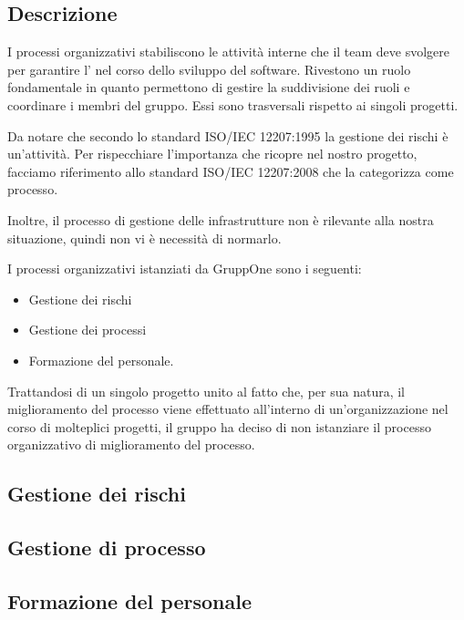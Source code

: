 \documentclass[../norme-di-progetto.tex]{subfiles}
\begin{document}
\subsection{Descrizione}%
\label{sub:processi_organizzativi/descrizione}

I processi organizzativi stabiliscono le attività interne che il team deve svolgere per garantire l' nel corso dello sviluppo del software.
Rivestono un ruolo fondamentale in quanto permettono di gestire la suddivisione dei ruoli e coordinare i membri del gruppo.
Essi sono trasversali rispetto ai singoli progetti.

Da notare che secondo lo standard ISO/IEC 12207:1995 la gestione dei rischi è un'attività.
Per rispecchiare l'importanza che ricopre nel nostro progetto, facciamo riferimento allo standard ISO/IEC 12207:2008 che la categorizza come processo.

Inoltre, il processo di gestione delle infrastrutture non è rilevante alla nostra situazione, quindi non vi è necessità di normarlo.

I processi organizzativi istanziati da GruppOne sono i seguenti:

\begin{itemize}
  \item Gestione dei rischi
  \item Gestione dei processi
  \item Formazione del personale.
\end{itemize}

Trattandosi di un singolo progetto unito al fatto che, per sua natura, il miglioramento del processo viene effettuato all'interno di un'organizzazione nel corso di molteplici progetti, il gruppo ha deciso di non istanziare il processo organizzativo di miglioramento del processo.


\subsection{Gestione dei rischi}%
\label{sub:gestione_dei_rischi}



\subsection{Gestione di processo}%
\label{sub:gestione_di_processo}



\subsection{Formazione del personale}%
\label{sub:formazione_del_personale}


\end{document}
